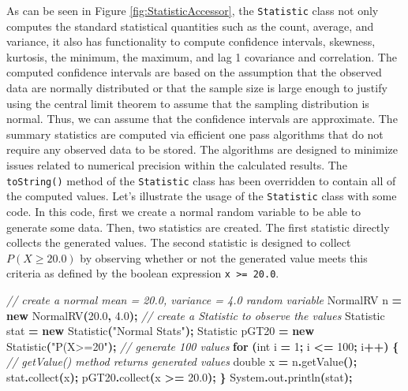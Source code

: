 \documentclass[
]{book}
\newenvironment{Shaded}{\begin{snugshade}}{\end{snugshade}}
\newcommand{\BuiltInTok}[1]{#1}
\newcommand{\CommentTok}[1]{\textcolor[rgb]{0.56,0.35,0.01}{\textit{#1}}}
\newcommand{\ControlFlowTok}[1]{\textcolor[rgb]{0.13,0.29,0.53}{\textbf{#1}}}
\newcommand{\DataTypeTok}[1]{\textcolor[rgb]{0.13,0.29,0.53}{#1}}
\newcommand{\DecValTok}[1]{\textcolor[rgb]{0.00,0.00,0.81}{#1}}
\newcommand{\FloatTok}[1]{\textcolor[rgb]{0.00,0.00,0.81}{#1}}
\newcommand{\FunctionTok}[1]{\textcolor[rgb]{0.00,0.00,0.00}{#1}}
\newcommand{\KeywordTok}[1]{\textcolor[rgb]{0.13,0.29,0.53}{\textbf{#1}}}
\newcommand{\NormalTok}[1]{#1}
\newcommand{\OperatorTok}[1]{\textcolor[rgb]{0.81,0.36,0.00}{\textbf{#1}}}
\newcommand{\StringTok}[1]{\textcolor[rgb]{0.31,0.60,0.02}{#1}}
\theoremstyle{definition}
\theoremstyle{definition}
\theoremstyle{definition}
\theoremstyle{definition}
\theoremstyle{remark}
\begin{document}
As can be seen in Figure \ref{fig:StatisticAccessor}, the \texttt{Statistic} class not only computes the standard statistical quantities such as the count, average, and variance, it also has functionality to compute confidence intervals, skewness, kurtosis, the minimum, the maximum, and lag 1 covariance and correlation. The computed confidence intervals are based on the assumption that the observed data are normally distributed or that the sample size is large enough to justify using the central limit theorem to assume that the sampling distribution is normal. Thus, we can assume that the confidence intervals are approximate. The summary statistics are computed via efficient one pass algorithms that do not require any observed data to be stored. The algorithms are designed to minimize issues related to numerical precision within the calculated results. The \texttt{toString()} method of the \texttt{Statistic} class has been overridden to contain all of the computed values. Let's illustrate the usage of the \texttt{Statistic} class with some code. In this code, first we create a normal random variable to be able to generate some data. Then, two statistics are created. The first statistic directly collects the generated values. The second statistic is designed to collect \(P(X\geq 20.0)\) by observing whether or not the generated value meets this criteria as defined by the boolean expression \texttt{x\ \textgreater{}=\ 20.0}.

\begin{Shaded}
\begin{Highlighting}[]
\CommentTok{// create a normal mean = 20.0, variance = 4.0 random variable}
\NormalTok{NormalRV n }\OperatorTok{=} \KeywordTok{new} \FunctionTok{NormalRV}\OperatorTok{(}\FloatTok{20.0}\OperatorTok{,} \FloatTok{4.0}\OperatorTok{);}
\CommentTok{// create a Statistic to observe the values}
\NormalTok{Statistic stat }\OperatorTok{=} \KeywordTok{new} \FunctionTok{Statistic}\OperatorTok{(}\StringTok{"Normal Stats"}\OperatorTok{);}
\NormalTok{Statistic pGT20 }\OperatorTok{=} \KeywordTok{new} \FunctionTok{Statistic}\OperatorTok{(}\StringTok{"P(X\textgreater{}=20"}\OperatorTok{);}
\CommentTok{// generate 100 values}
\ControlFlowTok{for} \OperatorTok{(}\DataTypeTok{int}\NormalTok{ i }\OperatorTok{=} \DecValTok{1}\OperatorTok{;}\NormalTok{ i }\OperatorTok{\textless{}=} \DecValTok{100}\OperatorTok{;}\NormalTok{ i}\OperatorTok{++)} \OperatorTok{\{}
    \CommentTok{// getValue() method returns generated values}
    \DataTypeTok{double}\NormalTok{ x }\OperatorTok{=}\NormalTok{ n}\OperatorTok{.}\FunctionTok{getValue}\OperatorTok{();}
\NormalTok{    stat}\OperatorTok{.}\FunctionTok{collect}\OperatorTok{(}\NormalTok{x}\OperatorTok{);}
\NormalTok{    pGT20}\OperatorTok{.}\FunctionTok{collect}\OperatorTok{(}\NormalTok{x }\OperatorTok{\textgreater{}=} \FloatTok{20.0}\OperatorTok{);}
\OperatorTok{\}}
\BuiltInTok{System}\OperatorTok{.}\FunctionTok{out}\OperatorTok{.}\FunctionTok{println}\OperatorTok{(}\NormalTok{stat}\OperatorTok{);}
\end{Highlighting}
\end{Shaded}
\end{document}
